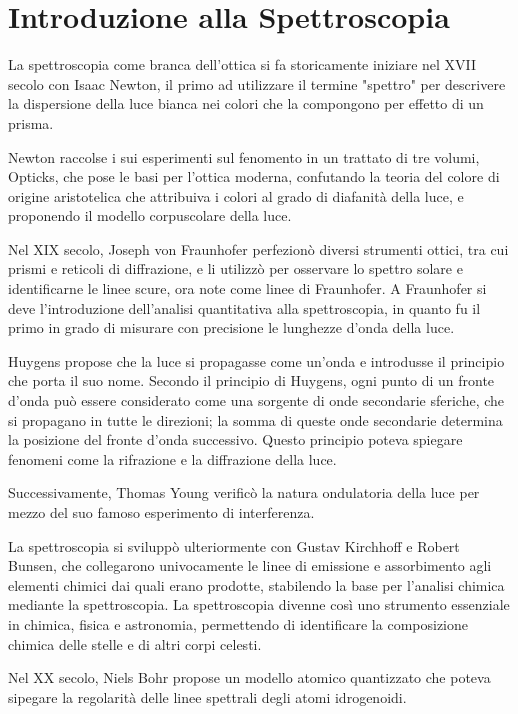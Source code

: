 \documentclass[12pt,a4paper]{report}
\begin{document}
\chapter{Introduzione alla Spettroscopia}

La spettroscopia come branca dell'ottica si fa storicamente iniziare nel XVII secolo con Isaac Newton, il primo ad utilizzare il termine "spettro" per descrivere la dispersione della luce bianca nei colori che la compongono per effetto di un prisma\cite{Newton1671}.

Newton raccolse i sui esperimenti sul fenomento in un trattato di tre volumi, Opticks\cite{newton1704opticks}, che pose le basi per l'ottica moderna, confutando la teoria del colore di origine aristotelica che attribuiva i colori al grado di diafanità della luce\cite{boscarol2024}, e proponendo il modello corpuscolare della luce.

Nel XIX secolo, Joseph von Fraunhofer perfezionò diversi strumenti ottici, tra cui prismi e reticoli di diffrazione, e li utilizzò per osservare lo spettro solare e identificarne le linee scure, ora note come linee di Fraunhofer\cite{Fraunhofer1817}. A Fraunhofer si deve l'introduzione dell'analisi quantitativa alla spettroscopia, in quanto fu il primo in grado di misurare con precisione le lunghezze d'onda della luce.

Huygens propose che la luce si propagasse come un'onda e introdusse il principio che porta il suo nome\cite{Huygens1690}. Secondo il principio di Huygens, ogni punto di un fronte d'onda può essere considerato come una sorgente di onde secondarie sferiche, che si propagano in tutte le direzioni; la somma di queste onde secondarie determina la posizione del fronte d'onda successivo. Questo principio poteva spiegare fenomeni come la rifrazione e la diffrazione della luce.

Successivamente, Thomas Young verificò la natura ondulatoria della luce per mezzo del suo famoso esperimento di interferenza\cite{Young1804}.

La spettroscopia si sviluppò ulteriormente con Gustav Kirchhoff e Robert Bunsen, che collegarono univocamente le linee di emissione e assorbimento agli elementi chimici dai quali erano prodotte\cite{Kirchhoff1861}, stabilendo la base per l'analisi chimica mediante la spettroscopia. La spettroscopia divenne così uno strumento essenziale in chimica, fisica e astronomia, permettendo di identificare la composizione chimica delle stelle e di altri corpi celesti.

Nel XX secolo, Niels Bohr propose un modello atomico quantizzato che poteva sipegare la regolarità delle linee spettrali degli atomi idrogenoidi\cite{Bohr1913}.
\end{document}
